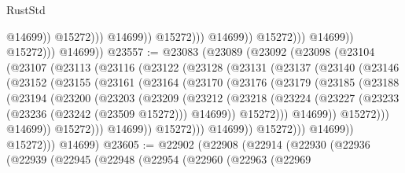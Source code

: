 \begin{lexlean}{RustStd}
\begin{coremodule}
                                                @14699))
                                            @15272)))
                                      @14699))
                                  @15272)))
                            @14699))
                        @15272)))
                  @14699))
              @15272)))
        @14699))
@23557 := @23083
    (@23089
      (@23092
        (@23098
          (@23104
            (@23107
              (@23113
                (@23116
                  (@23122
                    (@23128
                      (@23131
                        (@23137
                          (@23140
                            (@23146
                              (@23152
                                (@23155
                                  (@23161
                                    (@23164
                                      (@23170
                                        (@23176
                                          (@23179
                                            (@23185
                                              (@23188
                                                (@23194
                                                  (@23200
                                                    (@23203
                                                      (@23209
                                                        (@23212
                                                          (@23218
                                                            (@23224
                                                              (@23227
                                                                (@23233
                                                                  (@23236 (@23242 (@23509 @15272)))
                                                                  @14699))
                                                              @15272)))
                                                        @14699))
                                                    @15272)))
                                              @14699))
                                          @15272)))
                                    @14699))
                                @15272)))
                          @14699))
                      @15272)))
                @14699))
            @15272)))
      @14699)
@23605 := @22902
    (@22908
      (@22914
        (@22930
          (@22936
            (@22939
              (@22945
                (@22948
                  (@22954
                    (@22960
                      (@22963
                        (@22969

\end{coremodule}
\end{lexlean}
